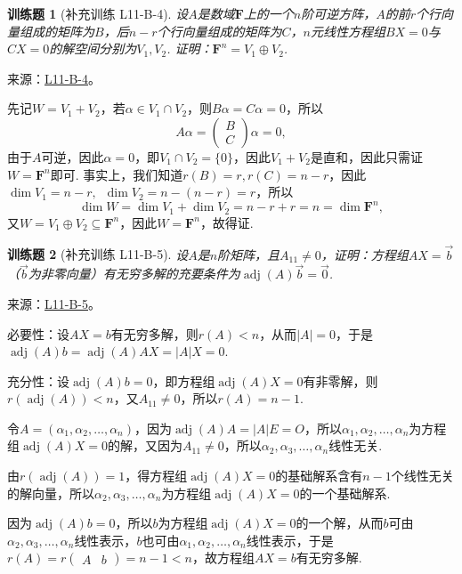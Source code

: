 \documentclass[UTF8,12pt,a4paper,fontset=fandol]{ctexart}
\newtheorem{exercise}{训练题}[section]
\begin{document}
\begin{exercise}[补充训练 L11-B-4]\label{prob:L11-B-4}
设$A$是数域$\mathbf{F}$上的一个$n$阶可逆方阵，$A$的前$r$个行向量组成的矩阵为$B$，后$n-r$个行向量组成的矩阵为$C$，$n$元线性方程组$BX=0$与$CX=0$的解空间分别为$V_1,V_2$. 证明：$\mathbf{F}^n=V_1\oplus V_2$.
\end{exercise}
\noindent 来源：\href{https://github.com/yhwu-is/Linear-Algebra-Left-Undone/blob/new/%E8%AE%B2%E4%B9%89/%E4%B8%93%E9%A2%98/11%20%E6%9C%9D%E8%8A%B1%E5%A4%95%E6%8B%BE.tex}{L11-B-4}。
\begin{solve}
先记$W=V_1+V_2$，若$\alpha\in V_1\cap V_2$，则$B\alpha=C\alpha=0$，所以
            \[A\alpha=\begin{pmatrix}
                    B \\
                    C
                \end{pmatrix}\alpha=0,\]
            由于$A$可逆，因此$\alpha=0$，即$V_1\cap V_2=\{0\}$，因此$V_1+V_2$是直和，因此只需证$W=\mathbf{F}^n$即可. 事实上，我们知道$r(B)=r,r(C)=n-r$，因此$\dim V_1=n-r,\enspace \dim V_2=n-(n-r)=r$，所以
            \[\dim W=\dim V_1+\dim V_2=n-r+r=n=\dim \mathbf{F}^n,\]
            又$W=V_1\oplus V_2\subseteq \mathbf{F}^n$，因此$W=\mathbf{F}^n$，故得证.
\end{solve}

\begin{exercise}[补充训练 L11-B-5]\label{prob:L11-B-5}
设$A$是$n$阶矩阵，且$A_{11}\neq 0$，证明：方程组$AX=\vec{b}$（$\vec{b}$为非零向量）有无穷多解的充要条件为$\operatorname{adj}(A)\vec{b}=\vec{0}$.
\end{exercise}
\noindent 来源：\href{https://github.com/yhwu-is/Linear-Algebra-Left-Undone/blob/new/%E8%AE%B2%E4%B9%89/%E4%B8%93%E9%A2%98/11%20%E6%9C%9D%E8%8A%B1%E5%A4%95%E6%8B%BE.tex}{L11-B-5}。
\begin{solve}
必要性：设$AX=b$有无穷多解，则$r(A)<n$，从而$|A|=0$，于是$\operatorname{adj}(A)b=\operatorname{adj}(A)AX=|A|X=0$.

          充分性：设$\operatorname{adj}(A)b=0$，即方程组$\operatorname{adj}(A)X=0$有非零解，则$r(\operatorname{adj}(A))<n$，又$A_{11}\neq 0$，所以$r(A)=n-1$.

          令$A=(\alpha_1,\alpha_2,\ldots,\alpha_n)$，因为$\operatorname{adj}(A)A=|A|E=O$，所以$\alpha_1,\alpha_2,\ldots,\alpha_n$为方程组$\operatorname{adj}(A)X=0$的解，又因为$A_{11}\neq 0$，所以$\alpha_2,\alpha_3,\ldots,\alpha_n$线性无关.

          由$r(\operatorname{adj}(A))=1$，得方程组$\operatorname{adj}(A)X=0$的基础解系含有$n-1$个线性无关的解向量，所以$\alpha_2,\alpha_3,\ldots,\alpha_n$为方程组$\operatorname{adj}(A)X=0$的一个基础解系.

          因为$\operatorname{adj}(A)b=0$，所以$b$为方程组$\operatorname{adj}(A)X=0$的一个解，从而$b$可由$\alpha_2,\alpha_3,\ldots,\alpha_n$线性表示，$b$也可由$\alpha_1,\alpha_2,\ldots,\alpha_n$线性表示，于是$r(A) = r\begin{pmatrix}A & b\end{pmatrix}=n-1<n$，故方程组$AX=b$有无穷多解.
\end{solve}
\end{document}
